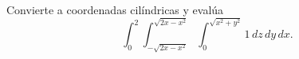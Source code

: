 Convierte a coordenadas cilíndricas y evalúa
\[
\int_0^2\int_{-\sqrt{2x-x^2}}^{\sqrt{2x-x^2}}
\int_0^{\sqrt{x^2+y^2}}1\,dz\,dy\,dx.
\]
